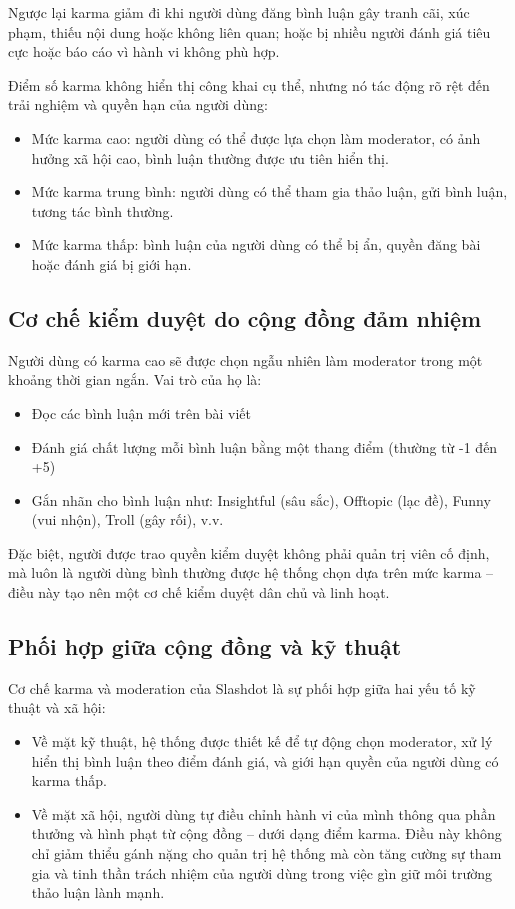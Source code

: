 Ngược lại karma giảm đi khi người dùng đăng bình luận gây tranh cãi, xúc phạm, thiếu nội dung hoặc không liên quan; hoặc bị nhiều người đánh giá tiêu cực hoặc báo cáo vì hành vi không phù hợp.

Điểm số karma không hiển thị công khai cụ thể, nhưng nó tác động rõ rệt đến trải nghiệm và quyền hạn của người dùng:
\begin{itemize}
  \item Mức karma cao: người dùng có thể được lựa chọn làm moderator, có ảnh hưởng xã hội cao, bình luận thường được ưu tiên hiển thị.
  \item Mức karma trung bình: người dùng có thể tham gia thảo luận, gửi bình luận, tương tác bình thường.
  \item Mức karma thấp: bình luận của người dùng có thể bị ẩn, quyền đăng bài hoặc đánh giá bị giới hạn.
\end{itemize}

\subsection{Cơ chế kiểm duyệt do cộng đồng đảm nhiệm}

Người dùng có karma cao sẽ được chọn ngẫu nhiên làm moderator trong một khoảng thời gian ngắn. Vai trò của họ là:
\begin{itemize}
  \item Đọc các bình luận mới trên bài viết
  \item Đánh giá chất lượng mỗi bình luận bằng một thang điểm (thường từ -1 đến +5)
  \item Gắn nhãn cho bình luận như: Insightful (sâu sắc), Offtopic (lạc đề), Funny (vui nhộn), Troll (gây rối), v.v.
\end{itemize}

Đặc biệt, người được trao quyền kiểm duyệt không phải quản trị viên cố định, mà luôn là người dùng bình thường được hệ thống chọn dựa trên mức karma --
điều này tạo nên một cơ chế kiểm duyệt dân chủ và linh hoạt.

\subsection{Phối hợp giữa cộng đồng và kỹ thuật}

Cơ chế karma và moderation của Slashdot là sự phối hợp giữa hai yếu tố kỹ thuật và xã hội:
\begin{itemize}
  \item Về mặt kỹ thuật, hệ thống được thiết kế để tự động chọn moderator, xử lý hiển thị bình luận theo điểm đánh giá, và giới hạn quyền của người dùng có karma thấp.
  \item Về mặt xã hội, người dùng tự điều chỉnh hành vi của mình thông qua phần thưởng và hình phạt từ cộng đồng -- dưới dạng điểm karma. Điều này không chỉ giảm thiểu gánh nặng cho quản trị hệ thống mà còn tăng cường sự tham gia và tinh thần trách nhiệm của người dùng trong việc gìn giữ môi trường thảo luận lành mạnh.
\end{itemize}
